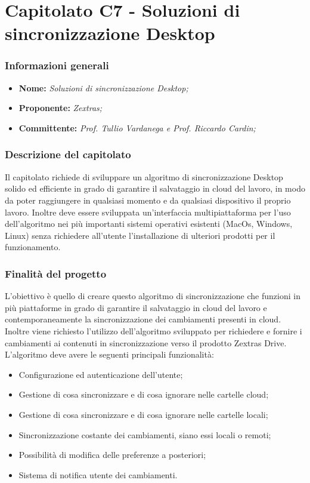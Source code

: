 \section{Capitolato C7 - Soluzioni di sincronizzazione Desktop}
\subsubsection{Informazioni generali}
	\begin{itemize}
	\item \textbf{Nome:} \textit{Soluzioni di sincronizzazione Desktop;}
	\item \textbf{Proponente:} \textit{Zextras;}
	\item \textbf{Committente:}  \textit{Prof. Tullio Vardanega e Prof. Riccardo Cardin;}
	\end{itemize}
\subsubsection{Descrizione del capitolato}
Il capitolato richiede di sviluppare un algoritmo di sincronizzazione Desktop solido ed efficiente in grado di garantire il salvataggio in cloud del lavoro, in modo da poter raggiungere in qualsiasi momento e da qualsiasi dispositivo il proprio lavoro. Inoltre deve essere sviluppata un'interfaccia multipiattaforma per l'uso dell'algoritmo nei più importanti sistemi operativi esistenti (MacOs, Windows, Linux) senza richiedere all'utente l'installazione di ulteriori prodotti per il funzionamento.
\subsubsection{Finalità del progetto}
L'obiettivo è quello di creare questo algoritmo di sincronizzazione che funzioni in più piattaforme in grado di garantire il salvataggio in cloud del lavoro e contemporaneamente la sincronizzazione dei cambiamenti presenti in cloud. Inoltre viene richiesto l'utilizzo dell’algoritmo sviluppato per richiedere e fornire i cambiamenti ai contenuti in sincronizzazione verso il prodotto Zextras Drive.
L'algoritmo deve avere le seguenti principali funzionalità:
\begin{itemize}
\item Configurazione ed autenticazione dell’utente;
\item Gestione di cosa sincronizzare e di cosa ignorare nelle cartelle cloud;
\item Gestione di cosa sincronizzare e di cosa ignorare nelle cartelle locali;
\item Sincronizzazione costante dei cambiamenti, siano essi locali o remoti;
\item Possibilità di modifica delle preferenze a posteriori;
\item Sistema di notifica utente dei cambiamenti.
\end{itemize}
